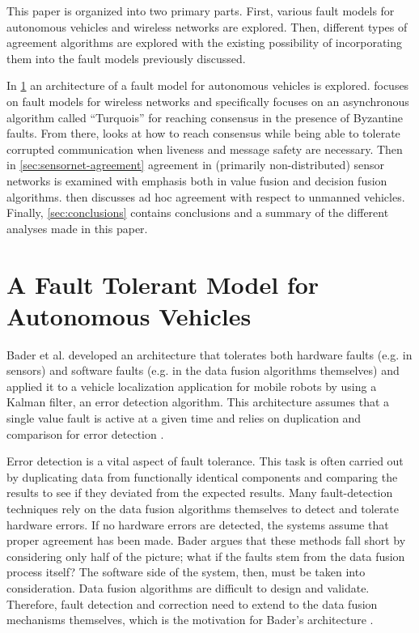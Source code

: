 \documentclass[twoside, conference]{IEEEtran}%
\begin{document}
This paper is organized into two primary parts.  First, various fault models for autonomous vehicles and wireless networks are explored.  Then, different types of agreement algorithms are explored with the existing possibility of incorporating them into the fault models previously discussed.

In \cref{sec:ftmodel-autonomous} an architecture of a fault model for autonomous vehicles is explored.   focuses on fault models for wireless networks and specifically focuses on an asynchronous algorithm called ``Turquois'' for reaching consensus in the presence of Byzantine faults.  From there,  looks at how to reach consensus while being able to tolerate corrupted communication when liveness and message safety are necessary.  Then in \cref{sec:sensornet-agreement} agreement in (primarily non-distributed) sensor networks is examined with emphasis both in value fusion and decision fusion algorithms.   then discusses ad hoc agreement with respect to unmanned vehicles.  Finally, \cref{sec:conclusions} contains conclusions and a summary of the different analyses made in this paper.

\section{A Fault Tolerant Model for Autonomous Vehicles}\label{sec:ftmodel-autonomous} %

Bader et al. developed an architecture that tolerates both hardware faults (e.g. in sensors) and software faults (e.g. in the data fusion algorithms themselves) and applied it to a vehicle localization application for mobile robots by using a Kalman filter, an error detection algorithm. This architecture assumes that a single value fault is active at a given time and relies on duplication and comparison for error detection \cite{Bader2014}.

Error detection is a vital aspect of fault tolerance. This task is often carried out by duplicating data from functionally identical components and comparing the results to see if they deviated from the expected results. Many fault-detection techniques rely on the data fusion algorithms themselves to detect and tolerate hardware errors. If no hardware errors are detected, the systems assume that proper agreement has been made. Bader argues that these methods fall short by considering only half of the picture; what if the faults stem from the data fusion process itself? The software side of the system, then, must be taken into consideration. Data fusion algorithms are difficult to design and validate. Therefore, fault detection and correction need to extend to the data fusion mechanisms themselves, which is the motivation for Bader's architecture \cite{Bader2014}.
\end{document}
